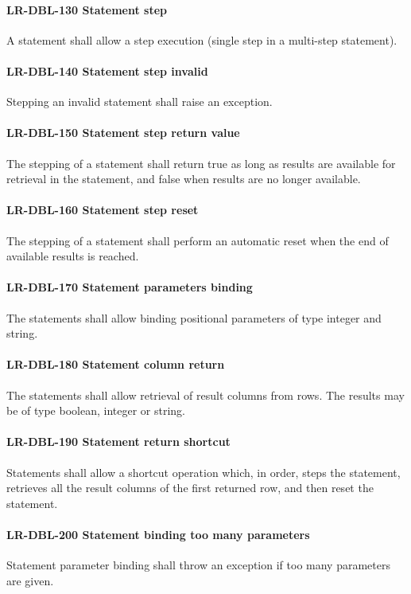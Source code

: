 \paragraph{LR-DBL-130 Statement step}
A statement shall allow a step execution (single step in a multi-step
statement).

\paragraph{LR-DBL-140 Statement step invalid}
Stepping an invalid statement shall raise an exception.

\paragraph{LR-DBL-150 Statement step return value}
The stepping of a statement shall return true as long as results
are available for retrieval in the statement, and false when results
are no longer available.

\paragraph{LR-DBL-160 Statement step reset}
The stepping of a statement shall perform an automatic reset when
the end of available results is reached.

\paragraph{LR-DBL-170 Statement parameters binding}
The statements shall allow binding positional parameters of type
integer and string.

\paragraph{LR-DBL-180 Statement column return}
The statements shall allow retrieval of result columns from rows.
The results may be of type boolean, integer or string.

\paragraph{LR-DBL-190 Statement return shortcut}
Statements shall allow a shortcut operation which, in order, steps
the statement, retrieves all the result columns of the first returned
row, and then reset the statement.

\paragraph{LR-DBL-200 Statement binding too many parameters}
Statement parameter binding shall throw an exception if
too many parameters are given.

